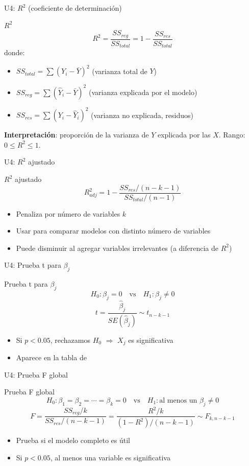 \documentclass[aspectratio=169, 11pt]{beamer}
\begin{document}
\begin{frame}{U4: $R^2$ (coeficiente de determinación)}
\begin{block}{$R^2$}
$$R^2 = \frac{SS_{reg}}{SS_{total}} = 1 - \frac{SS_{res}}{SS_{total}}$$
donde:
\begin{itemize}
\item $SS_{total} = \sum (Y_i - \bar{Y})^2$ (varianza total de $Y$)
\item $SS_{reg} = \sum (\hat{Y}_i - \bar{Y})^2$ (varianza explicada por el modelo)
\item $SS_{res} = \sum (Y_i - \hat{Y}_i)^2$ (varianza no explicada, residuos)
\end{itemize}
\textbf{Interpretación}: proporción de la varianza de $Y$ explicada por las $X$. Rango: $0 \leq R^2 \leq 1$.
\end{block}
\end{frame}

\begin{frame}{U4: $R^2$ ajustado}
\begin{block}{$R^2$ ajustado}
$$R^2_{adj} = 1 - \frac{SS_{res}/(n-k-1)}{SS_{total}/(n-1)}$$
\begin{itemize}
\item Penaliza por número de variables $k$
\item Usar para comparar modelos con distinto número de variables
\item Puede disminuir al agregar variables irrelevantes (a diferencia de $R^2$)
\end{itemize}
\end{block}
\end{frame}

\begin{frame}{U4: Prueba t para $\beta_j$}
\begin{block}{Prueba t para $\beta_j$}
$$H_0: \beta_j = 0 \quad \text{vs} \quad H_1: \beta_j \neq 0$$
$$t = \frac{\hat{\beta}_j}{SE(\hat{\beta}_j)} \sim t_{n-k-1}$$
\begin{itemize}
\item Si $p < 0.05$, rechazamos $H_0$ $\Rightarrow$ $X_j$ es significativa
\item Aparece en la tabla de 
\end{itemize}
\end{block}
\end{frame}

\begin{frame}{U4: Prueba F global}
\begin{block}{Prueba F global}
$$H_0: \beta_1 = \beta_2 = \cdots = \beta_k = 0 \quad \text{vs} \quad H_1: \text{al menos un } \beta_j \neq 0$$
$$F = \frac{SS_{reg}/k}{SS_{res}/(n-k-1)} = \frac{R^2/k}{(1-R^2)/(n-k-1)} \sim F_{k, n-k-1}$$
\begin{itemize}
\item Prueba si el modelo completo es útil
\item Si $p < 0.05$, al menos una variable es significativa
\end{itemize}
\end{block}
\end{frame}
\end{document}
